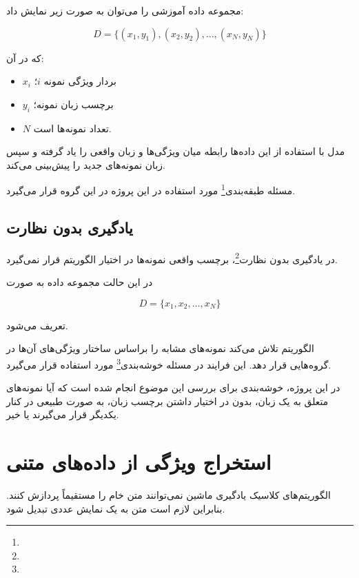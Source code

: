 \documentclass[12pt,a4paper,oneside]{report}
\begin{document}
مجموعه داده آموزشی را می‌توان به صورت زیر نمایش داد:

\begin{equation}
D=
\{(x_1,y_1),(x_2,y_2),\ldots,(x_N,y_N)\}
\end{equation}

که در آن:

\begin{itemize}
	\item $x_i$ بردار ویژگی نمونه $i$؛
	\item $y_i$ برچسب زبان نمونه؛
	\item $N$ تعداد نمونه‌ها است.
\end{itemize}

مدل با استفاده از این داده‌ها رابطه میان ویژگی‌ها و زبان واقعی را یاد گرفته و سپس زبان نمونه‌های جدید را پیش‌بینی می‌کند.

مسئله طبقه‌بندی\footnote{} مورد استفاده در این پروژه در این گروه قرار می‌گیرد.


\subsection{یادگیری بدون نظارت}

در یادگیری بدون نظارت\footnote{}، برچسب واقعی نمونه‌ها در اختیار الگوریتم قرار نمی‌گیرد.

در این حالت مجموعه داده به صورت

\begin{equation}
D=\{x_1,x_2,\ldots,x_N\}
\end{equation}

تعریف می‌شود.

الگوریتم تلاش می‌کند نمونه‌های مشابه را براساس ساختار ویژگی‌های آن‌ها در گروه‌هایی قرار دهد. این فرایند در مسئله خوشه‌بندی\footnote{} مورد استفاده قرار می‌گیرد.

در این پروژه، خوشه‌بندی برای بررسی این موضوع انجام شده است که آیا نمونه‌های متعلق به یک زبان، بدون در اختیار داشتن برچسب زبان، به صورت طبیعی در کنار یکدیگر قرار می‌گیرند یا خیر.


\section{استخراج ویژگی از داده‌های متنی}

الگوریتم‌های کلاسیک یادگیری ماشین نمی‌توانند متن خام را مستقیماً پردازش کنند. بنابراین لازم است متن به یک نمایش عددی تبدیل شود.
\end{document}
